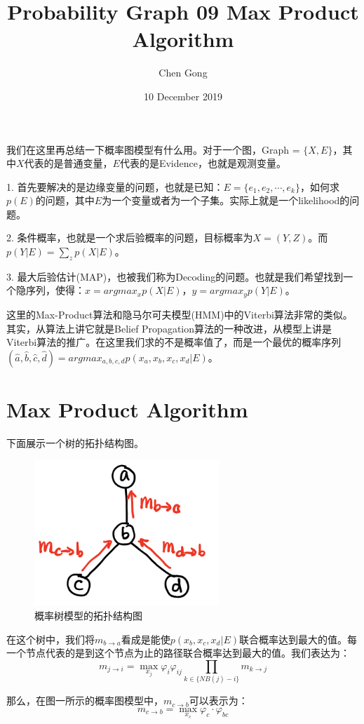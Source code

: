 \documentclass[a4paper]{article}
\title{Probability Graph 09 Max Product Algorithm}
\author{Chen Gong}
\date{10 December 2019}
\begin{document}
\maketitle
我们在这里再总结一下概率图模型有什么用。对于一个图，Graph = $\{ X,E \}$，其中$X$代表的是普通变量，$E$代表的是Evidence，也就是观测变量。

1. 首先要解决的是边缘变量的问题，也就是已知：$E=\{ e_1,e_2,\cdots,e_k \}$，如何求$p(E)$的问题，其中$E$为一个变量或者为一个子集。实际上就是一个likelihood的问题。

2. 条件概率，也就是一个求后验概率的问题，目标概率为$X=(Y,Z)$。而$p(Y|E) = \sum_z p(X|E)$。

3. 最大后验估计(MAP)，也被我们称为Decoding的问题。也就是我们希望找到一个隐序列，使得：$\hat{x} = argmax_x p(X|E)$，$\hat{y} = argmax_y p(Y|E)$。

这里的Max-Product算法和隐马尔可夫模型(HMM)中的Viterbi算法非常的类似。其实，从算法上讲它就是Belief Propagation算法的一种改进，从模型上讲是Viterbi算法的推广。在这里我们求的不是概率值了，而是一个最优的概率序列$(\hat{a},\hat{b},\hat{c},\hat{d}) = argmax_{a,b,c,d}p(x_a,x_b,x_c,x_d|E)$。

\section{Max Product Algorithm}
下面展示一个树的拓扑结构图。
\begin{figure}[H]
    \centering
    \includegraphics[width=.35\textwidth]{微信图片_20191210100004.png}
    \caption{概率树模型的拓扑结构图}
    \label{fig:my_label_1}
\end{figure}

在这个树中，我们将$m_{b \longrightarrow a}$看成是能使$p(x_b,x_c,x_d|E)$联合概率达到最大的值。每一个节点代表的是到这个节点为止的路径联合概率达到最大的值。我们表达为：
\begin{equation}
    m_{j\longrightarrow i} = \max_{x_j} \varphi_i\varphi_{ij}\prod_{k\in \{NB(j)-i\}}m_{k \longrightarrow j}
\end{equation}

那么，在图一所示的概率图模型中，$m_{c\longrightarrow b}$可以表示为：
\begin{equation}
    m_{c\longrightarrow b}=\max_{x_c} \varphi_c\cdot \varphi_{bc}
\end{equation}
\end{document}

